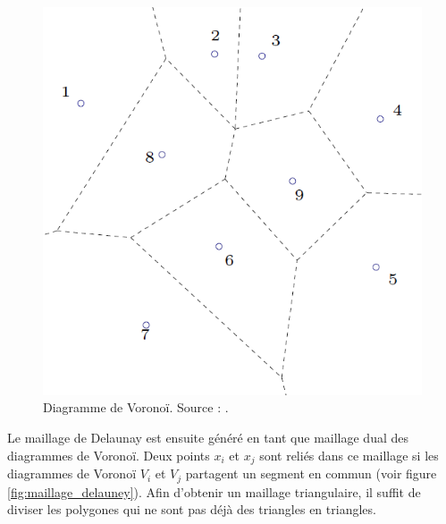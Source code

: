 \begin{figure}[!h]
    \centering
    \includegraphics[scale=0.55]{images/voronoi_diagram.png}
    \caption{Diagramme de Voronoï. Source : \cite{hecht2007maillage}.}
    \label{fig:voronoi_diagram}
\end{figure}

Le maillage de Delaunay est ensuite généré en tant que maillage dual des diagrammes de Voronoï. Deux points $x_i$ et $x_j$ sont reliés dans ce maillage si les diagrammes de Voronoï $V_i$ et $V_j$ partagent un segment en commun (voir figure \ref{fig:maillage_delauney}). Afin d'obtenir un maillage triangulaire, il suffit de diviser les polygones qui ne sont pas déjà des triangles en triangles.

